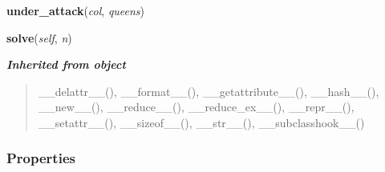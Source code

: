     \label{hal:maths:maths:EightQueen:under_attack}

    \vspace{0.5ex}

\hspace{.8\funcindent}\begin{boxedminipage}{\funcwidth}

    \raggedright \textbf{under\_attack}(\textit{col}, \textit{queens})

\setlength{\parskip}{2ex}
\setlength{\parskip}{1ex}
    \end{boxedminipage}

    \label{hal:maths:maths:EightQueen:solve}

    \vspace{0.5ex}

\hspace{.8\funcindent}\begin{boxedminipage}{\funcwidth}

    \raggedright \textbf{solve}(\textit{self}, \textit{n})

\setlength{\parskip}{2ex}
\setlength{\parskip}{1ex}
    \end{boxedminipage}


\large{\textbf{\textit{Inherited from object}}}

\begin{quote}
\_\_delattr\_\_(), \_\_format\_\_(), \_\_getattribute\_\_(), \_\_hash\_\_(), \_\_new\_\_(), \_\_reduce\_\_(), \_\_reduce\_ex\_\_(), \_\_repr\_\_(), \_\_setattr\_\_(), \_\_sizeof\_\_(), \_\_str\_\_(), \_\_subclasshook\_\_()
\end{quote}


  \subsubsection{Properties}

